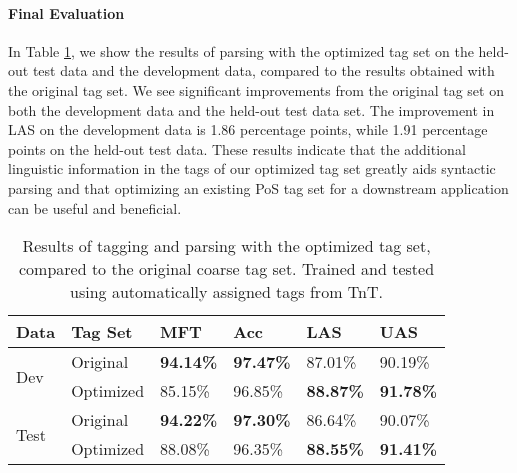 \documentclass[11pt,a4paper]{article}
\begin{document}
\paragraph{Final Evaluation}
In Table \ref{finalresults}, we show the results of parsing with the optimized
tag set on the held-out test data and the development data, compared to the
results obtained with the original tag set. We see significant improvements
from the original tag set on both the development data and the held-out test
data set. The improvement in LAS on the development data is 1.86 percentage
points, while 1.91 percentage points on the held-out test data. These results
indicate that the additional linguistic information in the tags of our
optimized tag set greatly aids syntactic parsing and that optimizing an
existing PoS tag set for a downstream application can be useful and beneficial.

\begin{table}
    \centering
    \smaller[0.5]
    \begin{tabular}{@{}llllll@{}}
        \toprule
        \textbf{Data} & \textbf{Tag Set} & \textbf{MFT} & \textbf{Acc} &
        \textbf{LAS} & \textbf{UAS} \\
        \midrule
        \multirow{2}{*}{Dev}
        & Original & \textbf{94.14\%} & \textbf{97.47\%} & 87.01\% & 90.19\% \\
        & Optimized & 85.15\% & 96.85\% & \textbf{88.87\%} & \textbf{91.78\%} \\
        \midrule
        \multirow{2}{*}{Test}
        & Original & \textbf{94.22\%} & \textbf{97.30\%} & 86.64\% & 90.07\% \\
        & Optimized & 88.08\% & 96.35\% & \textbf{88.55\%} & \textbf{91.41\%} \\
        \bottomrule
    \end{tabular}
    \caption{Results of tagging and parsing with the optimized tag set,
        compared to the original coarse tag set. Trained and tested using
        automatically assigned tags from TnT.}
    \label{finalresults}
\end{table}

\end{document}
